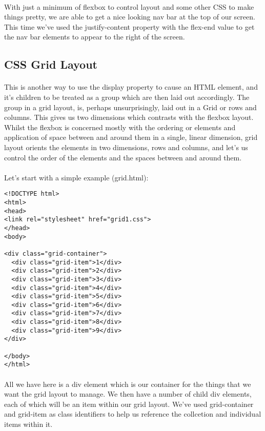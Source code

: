 \documentclass[10pt, a4paper]{article}
\begin{document}
\paragraph{} With just a minimum of flexbox to control layout and some other CSS to make things pretty, we are able to get a nice looking nav bar at the top of our screen. This time we've used the justify-content property with the flex-end value to get the nav bar elements to appear to the right of the screen.

\subsection*{CSS Grid Layout}
\paragraph{} This is another way to use the display property to cause an HTML element, and it's children to be treated as a group which are then laid out accordingly. The group in a grid layout, is, perhaps unsurprisingly, laid out in a Grid or rows and columns. This gives us two dimensions which contrasts with the flexbox layout. Whilst the flexbox is concerned mostly with the ordering or elements and application of space between and around them in a single, linear dimension, grid layout orients the elements in two dimensions, rows and columns, and let's us control the order of the elements and the spaces between and around them.

\paragraph{} Let's start with a simple example (grid.html):
\begin{lstlisting}
<!DOCTYPE html>
<html>
<head>
<link rel="stylesheet" href="grid1.css">
</head>
<body>

<div class="grid-container">
  <div class="grid-item">1</div>
  <div class="grid-item">2</div>
  <div class="grid-item">3</div>  
  <div class="grid-item">4</div>
  <div class="grid-item">5</div>
  <div class="grid-item">6</div>  
  <div class="grid-item">7</div>
  <div class="grid-item">8</div>
  <div class="grid-item">9</div>
</div>

</body>
</html>
\end{lstlisting}
\paragraph{} All we have here is a div element which is our container for the things that we want the grid layout to manage. We then have a number of child div elements, each of which will be an item within our grid layout. We've used grid-container and grid-item as class identifiers to help us reference the collcetion and individual items within it.
\end{document}
